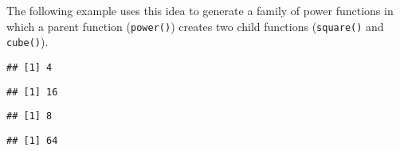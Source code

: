 The following example uses this idea to generate a family of power
functions in which a parent function (\texttt{power()}) creates two
child functions (\texttt{square()} and \texttt{cube()}).

\begin{Shaded}
\begin{Highlighting}[]
\StringTok{ }
\OperatorTok{^}\StringTok{ }
\NormalTok{  \}}
\NormalTok{\}}

\StringTok{ }\NormalTok{(}\NormalTok{)}
\NormalTok{(}\NormalTok{)}
\end{Highlighting}
\end{Shaded}

\begin{verbatim}
## [1] 4
\end{verbatim}

\begin{Shaded}
\begin{Highlighting}[]
\NormalTok{(}\NormalTok{)}
\end{Highlighting}
\end{Shaded}

\begin{verbatim}
## [1] 16
\end{verbatim}

\begin{Shaded}
\begin{Highlighting}[]
\StringTok{ }\NormalTok{(}\NormalTok{)}
\NormalTok{(}\NormalTok{)}
\end{Highlighting}
\end{Shaded}

\begin{verbatim}
## [1] 8
\end{verbatim}

\begin{Shaded}
\begin{Highlighting}[]
\NormalTok{(}\NormalTok{)}
\end{Highlighting}
\end{Shaded}

\begin{verbatim}
## [1] 64
\end{verbatim}

